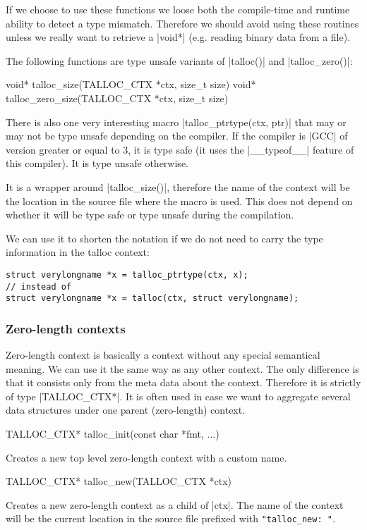 If we choose to use these functions we loose both the compile-time and runtime
ability to detect a type mismatch. Therefore we should avoid using these
routines unless we really want to retrieve a |void*| (e.g. reading binary data
from a file).

The following functions are type unsafe variants of |talloc()| and
|talloc_zero()|:

\begin{funcproto}
void* talloc_size(TALLOC_CTX *ctx, size_t size)
void* talloc_zero_size(TALLOC_CTX *ctx, size_t size)
\end{funcproto}
\funclistend
There is also one very interesting macro |talloc_ptrtype(ctx, ptr)| that may or
may not be type unsafe depending on the compiler. If the compiler is |GCC| of
version greater or equal to 3, it is type safe (it uses the |__typeof__|
feature of this compiler). It is type unsafe otherwise.

It is a wrapper around |talloc_size()|, therefore the name of the context will
be the location in the source file where the macro is used. This does not depend
on whether it will be type safe or type unsafe during the compilation.

We can use it to shorten the notation if we do not need to carry the type
information in the talloc context:

\begin{lstlisting}[caption={talloc_ptrtype(ctx, ptr)},label=lst:talloc_ptrtype]
struct verylongname *x = talloc_ptrtype(ctx, x);
// instead of
struct verylongname *x = talloc(ctx, struct verylongname);
\end{lstlisting}

\subsubsection{Zero-length contexts}

Zero-length context is basically a context without any special semantical
meaning. We can use it the same way as any other context. The only difference is
that it consists only from the meta data about the context. Therefore it is
strictly of type |TALLOC_CTX*|. It is often used in case we want to aggregate
several data structures under one parent (zero-length) context.

\begin{funcproto}
TALLOC_CTX* talloc_init(const char *fmt, ...)
\end{funcproto}
\begin{funcdesc}
Creates a new top level zero-length context with a custom name.
\end{funcdesc}
\begin{funcproto}
TALLOC_CTX* talloc_new(TALLOC_CTX *ctx)
\end{funcproto}
\begin{funcdesc}
Creates a new zero-length context as a child of |ctx|. The name of the context
will be the current location in the source file prefixed with
\lstinline[showspaces=true]{"talloc_new: "}.
\end{funcdesc}

